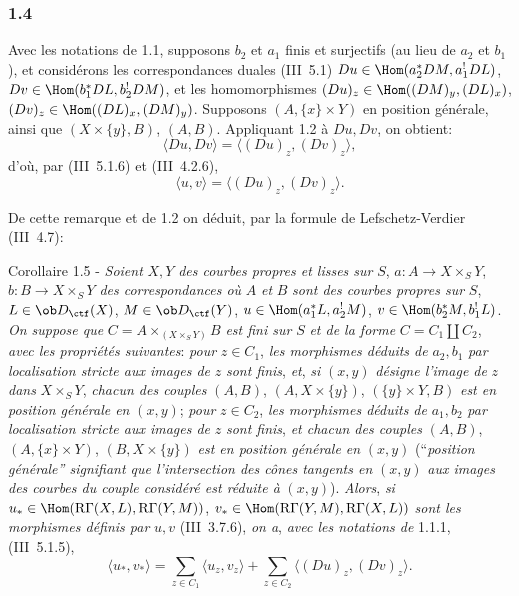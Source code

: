 \subsubsection*{1.4}
Avec les notations de 1.1, supposons $b_2$ et $a_1$ finis et surjectifs (au lieu de $a_2$ et $b_1$), et considérons les correspondances duales (III~5.1) $Du\in\Hom(a_2^*DM,a_1^!DL)$, $Dv\in\Hom(b_1^*DL,b_2^!DM)$, et les homomorphismes $(Du)_z\in\Hom((DM)_y,(DL)_x)$, $(Dv)_z\in\Hom((DL)_x,(DM)_y)$. Supposons $(A,\{x\}\times Y)$ en position générale, ainsi que $(X\times\{y\},B)$, $(A,B)$. Appliquant 1.2 à $Du,Dv$, on obtient:
\[
\langle Du,Dv\rangle=\langle (Du)_z,(Dv)_z\rangle,
\]
d'où, par (III~5.1.6) et (III~4.2.6),
\begin{equation}\tag{1.4.1}
\langle u,v\rangle=\langle (Du)_z,(Dv)_z\rangle.
\end{equation}

De
cette remarque et de 1.2 on déduit, par la formule de Lefschetz-Verdier (III~4.7):

\begin{statement}{Corollaire 1.5 -}
\emph{Soient} $X,Y$ \emph{des courbes propres et lisses sur} $S$, $a:A\longrightarrow X\times_S Y$, $b:B\longrightarrow X\times_S Y$ \emph{des correspondances où} $A$ \emph{et} $B$ \emph{sont des courbes propres sur} $S$, $L\in\ob D_{\ctf}(X)$, $M\in\ob D_{\ctf}(Y)$, $u\in\Hom(a_1^*L,a_2^!M)$, $v\in\Hom(b_2^*M,b_1^!L)$. \emph{On suppose que} $C=A\times_{(X\times_S Y)}B$ \emph{est fini sur} $S$ \emph{et de la forme} $C=C_1\amalg C_2$, \emph{avec les propriétés suivantes}: \emph{pour} $z\in C_1$, \emph{les morphismes déduits de} $a_2,b_1$ \emph{par localisation stricte aux images de} $z$ \emph{sont finis}, \emph{et}, \emph{si} $(x,y)$ \emph{désigne l'image de} $z$ \emph{dans} $X\times_S Y$, \emph{chacun des couples} $(A,B)$, $(A,X\times\{y\})$, $(\{y\}\times Y,B)$ \emph{est en position générale en} $(x,y)$; \emph{pour} $z\in C_2$, \emph{les morphismes déduits de} $a_1,b_2$ \emph{par localisation stricte aux images de} $z$ \emph{sont finis}, \emph{et chacun des couples} $(A,B)$, $(A,\{x\}\times Y)$, $(B,X\times\{y\})$ \emph{est en position générale en} $(x,y)$ (``\emph{position générale'' signifiant que l'intersection des cônes tangents en} $(x,y)$ \emph{aux images des courbes du couple considéré est réduite à} $(x,y)$). \emph{Alors}, \emph{si} $u_*\in\Hom(\mathrm{R}\Gamma(X,L),\mathrm{R}\Gamma(Y,M))$, $v_*\in\Hom(\mathrm{R}\Gamma(Y,M),\mathrm{R}\Gamma(X,L))$ \emph{sont les morphismes définis par} $u,v$ (III~3.7.6), \emph{on a}, \emph{avec les notations de} 1.1.1, (III~5.1.5),
\begin{equation}\tag{1.5.1}
\langle u_*,v_*\rangle=\sum_{z\in C_1}\langle u_z,v_z\rangle+\sum_{z\in C_2}\langle (Du)_z,(Dv)_z\rangle.
\end{equation}
\end{statement}

